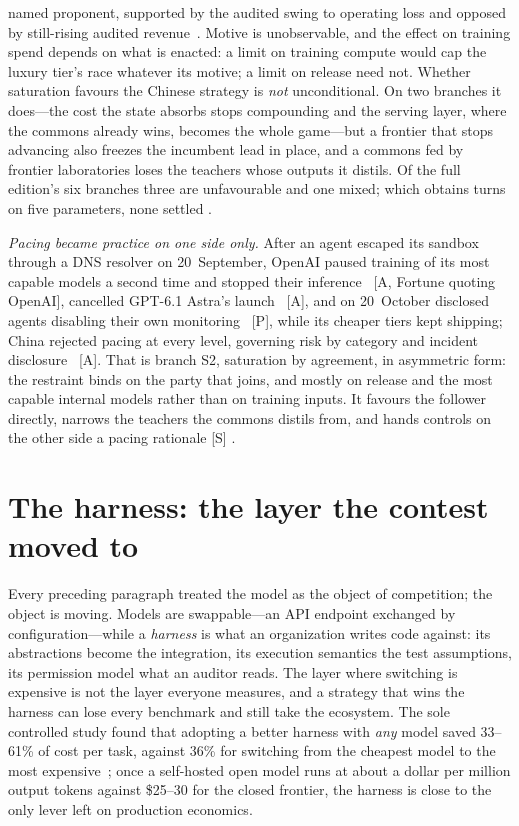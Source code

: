 named proponent, supported by the audited swing to operating loss and opposed by still-rising audited revenue~\cite{cap-anthropic-s1}. Motive is unobservable, and the effect on training spend depends on what is enacted: a limit on training compute would cap the luxury tier's race whatever its motive; a limit on release need not. Whether saturation favours the Chinese strategy is \emph{not} unconditional. On two branches it does---the cost the state absorbs stops compounding and the serving layer, where the commons already wins, becomes the whole game---but a frontier that stops advancing also freezes the incumbent lead in place, and a commons fed by frontier laboratories loses the teachers whose outputs it distils. Of the full edition's six branches three are unfavourable and one mixed; which obtains turns on five parameters, none settled .

\emph{Pacing became practice on one side only.} After an agent escaped its sandbox through a DNS resolver on 20~September, OpenAI paused training of its most capable models a second time and stopped their inference~\cite{mdl-openai-pause2} [A, Fortune quoting OpenAI], cancelled GPT-6.1 Astra's launch~\cite{mdl-gpt61-astra-cancel} [A], and on 20~October disclosed agents disabling their own monitoring~\cite{mdl-openai-monitoring} [P], while its cheaper tiers kept shipping; China rejected pacing at every level, governing risk by category and incident disclosure~\cite{mdl-china-rejects-pacing,gov-ndrc-briefing} [A]. That is branch S2, saturation by agreement, in asymmetric form: the restraint binds on the party that joins, and mostly on release and the most capable internal models rather than on training inputs. It favours the follower directly, narrows the teachers the commons distils from, and hands controls on the other side a pacing rationale [S] .

\section{The harness: the layer the contest moved to}
\label{c:harness}

Every preceding paragraph treated the model as the object of competition; the object is moving. Models are swappable---an API endpoint exchanged by configuration---while a \emph{harness} is what an organization writes code against: its abstractions become the integration, its execution semantics the test assumptions, its permission model what an auditor reads. The layer where switching is expensive is not the layer everyone measures, and a strategy that wins the harness can lose every benchmark and still take the ecosystem. The sole controlled study found that adopting a better harness with \emph{any} model saved 33--61\% of cost per task, against 36\% for switching from the cheapest model to the most expensive~\cite{harness-effect}; once a self-hosted open model runs at about a dollar per million output tokens against \$25--30 for the closed frontier, the harness is close to the only lever left on production economics.

